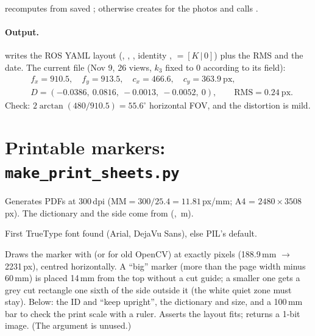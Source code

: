  recomputes from saved ; otherwise creates
 for the photos and calls .

\paragraph{Output.}  writes the ROS  YAML layout
(, , ,
identity ,  $= [K\,|\,0]$) plus the RMS and the date. The
current file (Nov 9, 26 views, $k_3$ fixed to 0 according to its  field):
$$
\begin{aligned}&f_x = 910.5,\quad f_y = 913.5,\quad c_x = 466.6,\quad c_y = 363.9\ \text{px},\\
&D = (-0.0386,\ 0.0816,\ -0.0013,\ -0.0052,\ 0),\qquad \text{RMS} = 0.24\ \text{px}.\end{aligned}
$$
Check: $2\arctan(480/910.5) = 55.6^\circ$ horizontal FOV, and the distortion is mild.

\section{Printable markers: \texorpdfstring{\texttt{make\_print\_sheets.py}}{make\_print\_sheets.py}}

Generates PDFs at 300\,dpi ($\text{MM} = 300/25.4 = 11.81$\,px/mm; A4 = $2480\times3508$\,px). The dictionary and
the side come from  (, \,m).

First TrueType font found (Arial, DejaVu Sans), else PIL's default.

Draws the marker with  (or  for old OpenCV) at exactly
 pixels (188.9\,mm $\to$ 2231\,px), centred horizontally. A ``big'' marker (more than
the page width minus 60\,mm) is placed 14\,mm from the top without a cut guide; a smaller one gets a grey cut
rectangle one sixth of the side outside it (the white quiet zone must stay). Below: the ID and ``keep upright'',
the dictionary and size, and a 100\,mm bar to check the print scale with a ruler. Asserts the layout fits; returns a
1-bit image. (The  argument is unused.)

